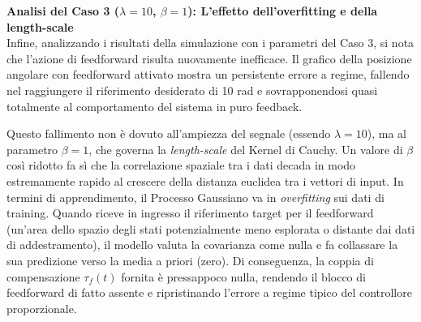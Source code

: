 \documentclass[a4paper,12pt]{article}
\begin{document}
\vspace{0.5cm}
\textbf{Analisi del Caso 3 ($\lambda=10$, $\beta=1$): L'effetto dell'overfitting e della length-scale} \\
Infine, analizzando i risultati della simulazione con i parametri del Caso 3, si nota che l'azione di feedforward risulta nuovamente inefficace. Il grafico della posizione angolare con feedforward attivato mostra un persistente errore a regime, fallendo nel raggiungere il riferimento desiderato di 10 rad e sovrapponendosi quasi totalmente al comportamento del sistema in puro feedback.

Questo fallimento non è dovuto all'ampiezza del segnale (essendo $\lambda=10$), ma al parametro $\beta=1$, che governa la \textit{length-scale} del Kernel di Cauchy. Un valore di $\beta$ così ridotto fa sì che la correlazione spaziale tra i dati decada in modo estremamente rapido al crescere della distanza euclidea tra i vettori di input. In termini di apprendimento, il Processo Gaussiano va in \textit{overfitting} sui dati di training. Quando riceve in ingresso il riferimento target per il feedforward (un'area dello spazio degli stati potenzialmente meno esplorata o distante dai dati di addestramento), il modello valuta la covarianza come nulla e fa collassare la sua predizione verso la media a priori (zero). Di conseguenza, la coppia di compensazione $\tau_f(t)$ fornita è pressappoco nulla, rendendo il blocco di feedforward di fatto assente e ripristinando l'errore a regime tipico del controllore proporzionale.
\end{document}
